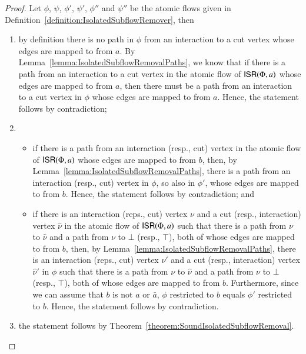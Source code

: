\begin{proof}
Let $\phi$, $\psi$, $\phi'$, $\psi'$, $\phi''$ and $\psi''$ be the atomic flows given in Definition~\ref{definition:IsolatedSubflowRemover}, then
\begin{enumerate}
\item by definition there is no path in $\phi$ from an interaction to a cut vertex whose edges are mapped to from $a$. By Lemma~\vref{lemma:IsolatedSubflowRemovalPaths}, we know that if there is a path from an interaction to a cut vertex in the atomic flow of $\mathsf{ISR}(\Phi,a)$ whose edges are mapped to from $a$, then there must be a path from an interaction to a cut vertex in $\phi$ whose edges are mapped to from $a$. Hence, the statement follows by contradiction;
\item
\begin{itemize}
 \item if there is a path from an interaction (resp., cut) vertex in the atomic flow of $\mathsf{ISR}(\Phi,a)$ whose edges are mapped to from $b$, then, by Lemma~\vref{lemma:IsolatedSubflowRemovalPaths}, there is a path from an interaction (resp., cut) vertex in $\phi$, so also in $\phi'$, whose edges are mapped to from $b$. Hence, the statement follows by contradiction; and
 \item if there is an interaction (reps., cut) vertex $\nu$ and a cut (resp., interaction) vertex $\hat\nu$ in the atomic flow of $\mathsf{ISR}(\Phi,a)$ such that there is a path from $\nu$ to $\hat\nu$ and a path from $\nu$ to $\bot$ (resp., $\top$), both of whose edges are mapped to from $b$, then, by Lemma~\vref{lemma:IsolatedSubflowRemovalPaths}, there is an interaction (reps., cut) vertex $\nu'$ and a cut (resp., interaction) vertex $\hat\nu'$ in $\phi$ such that there is a path from $\nu$ to $\hat\nu$ and a path from $\nu$ to $\bot$ (resp., $\top$), both of whose edges are mapped to from $b$. Furthermore, since we can assume that $b$ is not $a$ or $\bar a$, $\phi$ restricted to $b$ equals $\phi'$ restricted to $b$. Hence, the statement follows by contradiction.
\end{itemize}
\item the statement follows by Theorem~\vref{theorem:SoundIsolatedSubflowRemoval}.
\end{enumerate}
\end{proof}

